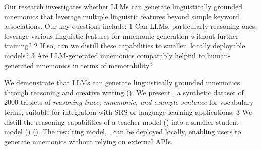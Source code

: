 Our research investigates whether LLMs can generate linguistically grounded mnemonics that leverage multiple linguistic features beyond simple keyword associations. Our key questions include: \numlist{1} Can LLMs, particularly reasoning ones, leverage various linguistic features for mnemonic generation without further training? \numlist{2} If so, can we distill these capabilities to smaller, locally deployable models? \numlist{3} Are LLM-generated mnemonics comparably helpful to human-generated mnemonics in terms of memorability?

We demonstrate that LLMs can generate linguistically grounded mnemonics through reasoning and creative writing (). We present \links, a synthetic dataset of 2000 triplets of \textit{reasoning trace, mnemonic, and example sentence} for vocabulary terms, suitable for integration with SRS or language learning applications. \numlist{3} We distill the reasoning capabilities of a teacher model (\teachermodel) into a smaller student model (\studentmodel) (). The resulting model, \linksys, can be deployed locally, enabling users to generate mnemonics without relying on external APIs.
